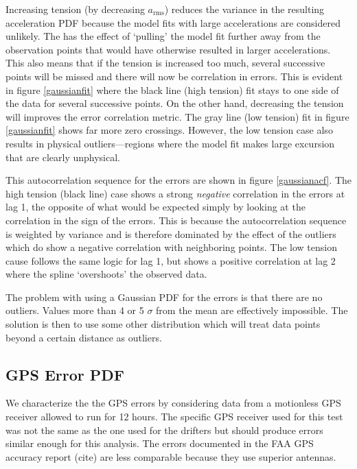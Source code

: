 \documentclass[twocol]{ametsoc}
\begin{document}
Increasing tension (by decreasing $a_{\textrm{rms}}$) reduces the variance in the resulting acceleration PDF because the model fits with large accelerations are considered unlikely. The has the effect of `pulling' the model fit further away from the observation points that would have otherwise resulted in larger accelerations. This also means that if the tension is increased too much, several successive points will be missed and there will now be correlation in errors. This is evident in figure \ref{gaussianfit} where the black line (high tension) fit stays to one side of the data for several successive points. On the other hand, decreasing the tension will improves the error correlation metric. The gray line (low tension) fit in figure \ref{gaussianfit} shows far more zero crossings. However, the low tension case also results in physical outliers---regions where the model fit makes large excursion that are clearly unphysical.

This autocorrelation sequence for the errors are shown in figure \ref{gaussianacf}. The high tension (black line) case shows a strong \emph{negative} correlation in the errors at lag 1, the opposite of what would be expected simply by looking at the correlation in the sign of the errors. This is because the autocorrelation sequence is weighted by variance and is therefore dominated by the effect of the outliers which do show a negative correlation with neighboring points. The low tension cause follows the same logic for lag 1, but shows a positive correlation at lag 2 where the spline `overshoots' the observed data.

The problem with using a Gaussian PDF for the errors is that there are no outliers. Values more than 4 or 5 $\sigma$ from the mean are effectively impossible. The solution is then to use some other distribution which will treat data points beyond a certain distance as outliers.

%
\subsection{GPS Error PDF}
%

We characterize the the GPS errors by considering data from a motionless GPS receiver allowed to run for 12 hours. The specific GPS receiver used for this test was not the same as the one used for the drifters but should produce errors similar enough for this analysis. The errors documented in the FAA GPS accuracy report (cite) are less comparable because they use superior antennas.
\end{document}
